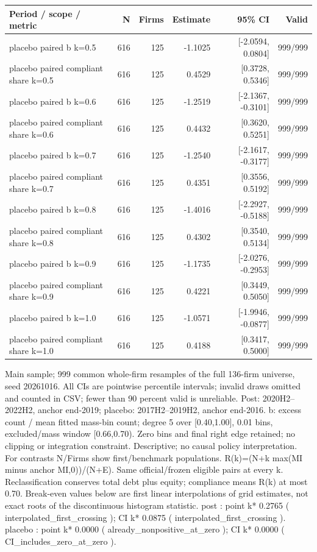 \begin{threeparttable}
\begin{tabular}{p{6.0cm}rrrrr}
\toprule
Period / scope / metric & N & Firms & Estimate & 95\% CI & Valid \\
\midrule
placebo paired b k=0.5 & 616 & 125 & -1.1025 & [-2.0594, 0.0804] & 999/999 \\
placebo paired compliant share k=0.5 & 616 & 125 & 0.4529 & [0.3728, 0.5346] & 999/999 \\
placebo paired b k=0.6 & 616 & 125 & -1.2519 & [-2.1367, -0.3101] & 999/999 \\
placebo paired compliant share k=0.6 & 616 & 125 & 0.4432 & [0.3620, 0.5251] & 999/999 \\
placebo paired b k=0.7 & 616 & 125 & -1.2540 & [-2.1617, -0.3177] & 999/999 \\
placebo paired compliant share k=0.7 & 616 & 125 & 0.4351 & [0.3556, 0.5192] & 999/999 \\
placebo paired b k=0.8 & 616 & 125 & -1.4016 & [-2.2927, -0.5188] & 999/999 \\
placebo paired compliant share k=0.8 & 616 & 125 & 0.4302 & [0.3540, 0.5134] & 999/999 \\
placebo paired b k=0.9 & 616 & 125 & -1.1735 & [-2.0276, -0.2953] & 999/999 \\
placebo paired compliant share k=0.9 & 616 & 125 & 0.4221 & [0.3449, 0.5050] & 999/999 \\
placebo paired b k=1.0 & 616 & 125 & -1.0571 & [-1.9946, -0.0877] & 999/999 \\
placebo paired compliant share k=1.0 & 616 & 125 & 0.4188 & [0.3417, 0.5000] & 999/999 \\
\bottomrule
\end{tabular}
\begin{tablenotes}[flushleft]\footnotesize
\item[] Main sample; 999 common whole-firm resamples of the full 136-firm universe, seed 20261016. All CIs are pointwise percentile intervals; invalid draws omitted and counted in CSV; fewer than 90 percent valid is unreliable. Post: 2020H2--2022H2, anchor end-2019; placebo: 2017H2--2019H2, anchor end-2016. b: excess count / mean fitted mass-bin count; degree 5 over [0.40,1.00], 0.01 bins, excluded/mass window [0.66,0.70). Zero bins and final right edge retained; no clipping or integration constraint. Descriptive; no causal policy interpretation. For contrasts N/Firms show first/benchmark populations. R(k)=(N+k max(MI minus anchor MI,0))/(N+E). Same official/frozen eligible pairs at every k. Reclassification conserves total debt plus equity; compliance means R(k) at most 0.70. Break-even values below are first linear interpolations of grid estimates, not exact roots of the discontinuous histogram statistic. post : point k* 0.2765 ( interpolated\_first\_crossing ); CI k* 0.0875 ( interpolated\_first\_crossing ). placebo : point k* 0.0000 ( already\_nonpositive\_at\_zero ); CI k* 0.0000 ( CI\_includes\_zero\_at\_zero ).
\end{tablenotes}
\end{threeparttable}
\endgroup
\par\medskip
